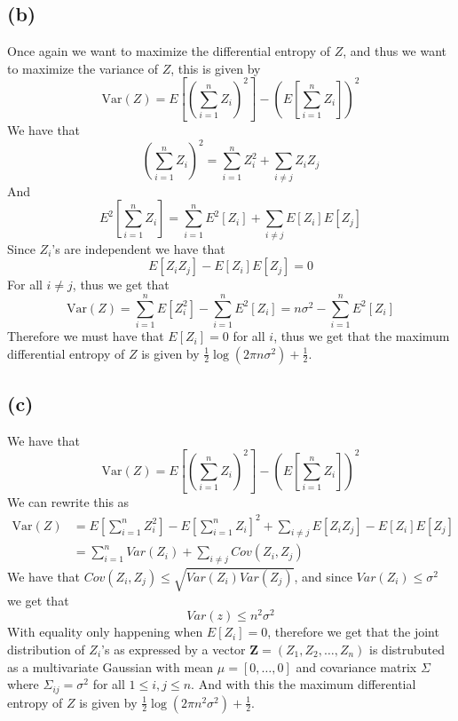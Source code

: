 \subsection*{(b)}
Once again we want to maximize the differential entropy of $Z$,
and thus we want to maximize the variance of $Z$, this is given by
$$\text{Var}(Z)=E[(\sum_{i=1}^{n}Z_i)^2]-(E[\sum_{i=1}^{n}Z_i])^2$$
We have that 
$$\left(\sum_{i=1}^{n}Z_i\right)^2=\sum_{i=1}^{n}Z_i^2+\sum_{i\neq j}Z_iZ_j$$
And
$$E^2[\sum_{i=1}^{n}Z_i]=\sum_{i=1}^{n}E^2[Z_i]+\sum_{i\neq j}E[Z_i]E[Z_j]$$
Since $Z_i$'s are independent we have that
$$E[Z_iZ_j]-E[Z_i]E[Z_j]=0$$
For all $i\neq j$, thus we get that
$$\text{Var}(Z)=\sum_{i=1}^{n}E[Z_i^2]-\sum_{i=1}^{n}E^2[Z_i]=n\sigma^2-\sum_{i=1}^{n}E^2[Z_i]$$
Therefore we must have that $E[Z_i]=0$ for all $i$, thus we get that
the maximum differential entropy of $Z$ is given by $\boxed{\frac{1}{2}\log(2\pi n\sigma^2)+\frac{1}{2}}$.
\subsection*{(c)}
We have that 
$$\text{Var}(Z)=E[(\sum_{i=1}^{n}Z_i)^2]-(E[\sum_{i=1}^{n}Z_i])^2$$
We can rewrite this as 
\begin{align*}
    \text{Var}(Z)&=E[\sum_{i=1}^{n}Z_i^2]-E[\sum_{i=1}^{n}Z_i]^2+\sum_{i\neq j}E[Z_iZ_j]-E[Z_i]E[Z_j]\\
    &=\sum_{i=1}^{n}Var(Z_i)+\sum_{i\neq j}Cov(Z_i,Z_j)
\end{align*}
We have that $Cov(Z_i,Z_j)\leq \sqrt{Var(Z_i)Var(Z_j)}$, and since 
$Var(Z_i)\leq \sigma^2$ we get that
$$Var(z)\leq n^2\sigma^2$$
With equality only happening when $E[Z_i]=0$, therefore we get that 
the joint distribution of $Z_i$'s as expressed by a vector  
$\mathbf{Z}=(Z_1,Z_2,\ldots,Z_n)$ is distrubuted as a multivariate Gaussian with mean $\mu=[0,\ldots,0]$ and covariance matrix
$\Sigma$ where $\Sigma_{ij}=\sigma^2$ for all $1\leq i,j\leq n$. And with this the 
maximum differential entropy of $Z$ is given by $\boxed{\frac{1}{2}\log(2\pi n^2\sigma^2)+\frac{1}{2}}$.


